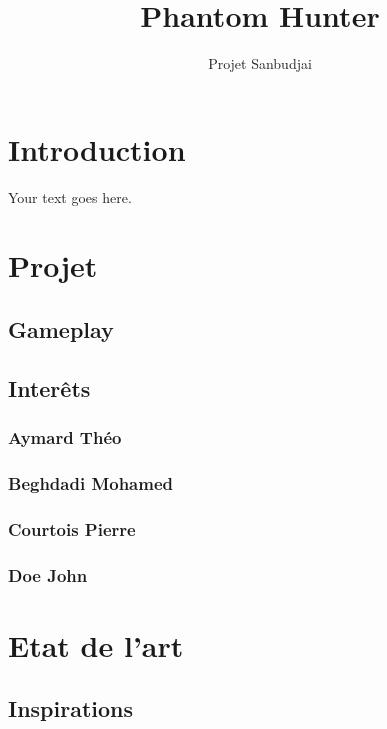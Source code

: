 \documentclass[11pt]{article} %
\title{Phantom Hunter}
\author{Projet Sanbudjai}
\begin{document}
\maketitle

\newpage

\tableofcontents

\newpage

\section{Introduction}

Your text goes here.

\section{Projet}

\subsection{Gameplay}

\subsection{Interêts}

\subsubsection{Aymard Théo}

\subsubsection{Beghdadi Mohamed}

\subsubsection{Courtois Pierre}

\subsubsection{Doe John}

\section{Etat de l'art}

\subsection{Inspirations}
\end{document}
